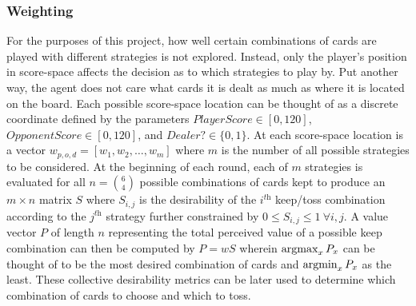 

\subsubsection{Weighting}



For the purposes of this project,
how well certain combinations of cards are played with different strategies
is not explored.
%
Instead, only the player's position in score-space affects the decision as to
which strategies to play by.
%
Put another way, the agent does not care what cards it is dealt as much as where
it is located on the board.
%
Each possible score-space location can be thought of as a discrete coordinate
defined by the parameters
$\textit{PlayerScore} \in [0, 120]$,
$\textit{OpponentScore} \in [0, 120]$,
and
$\textit{Dealer?} \in \{0,1\}$.
%
At each score-space location is a vector $w_{p,o,d} = [w_1,w_2,\ldots,w_m]$
where $m$ is the number of all possible strategies to be considered.
At the beginning of each round, each of $m$ strategies is evaluated for all
$n = {6 \choose 4}$ possible combinations of cards kept to produce an
$m \times n$ matrix $S$
where $S_{i,j}$ is the desirability of the $i^{\textit{th}}$ keep/toss
combination according to the $j^{\textit{th}}$ strategy
further constrained by
$0 \le S_{i,j} \le 1\ \forall i,j$.
%
A value vector $P$ of length $n$ representing the total perceived value of a
possible keep combination
can then be computed by
$P = w S$
wherein $\operatorname*{argmax}_{x}{P_x}$ can be thought of to be the most desired combination
of cards and $\operatorname*{argmin}_{x}{P_x}$ as the least.
%
These collective desirability metrics can be later used to determine which
combination of cards to choose and which to toss.




